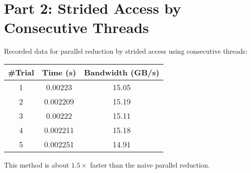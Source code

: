 \section{Part 2: Strided Access by Consecutive Threads }
\label{sec:part2}

Recorded data for parallel reduction by strided access using consecutive threads:

\begin{center}
	\begin{tabular}{||c c c||} 
		\hline
		\#Trial & Time (s) & Bandwidth (GB/s) \\ [0.5ex] 
		\hline\hline
		1 & 0.00223 & 15.05 \\ 
		\hline
		2 & 0.002209 & 15.19 \\
		\hline
		3 & 0.00222 & 15.11 \\
		\hline
		4 & 0.002211 & 15.18 \\
		\hline
		5 & 0.002251 & 14.91 \\
		\hline
	\end{tabular}
\end{center}

This method is about $1.5\times$ faster than the naive parallel reduction.

